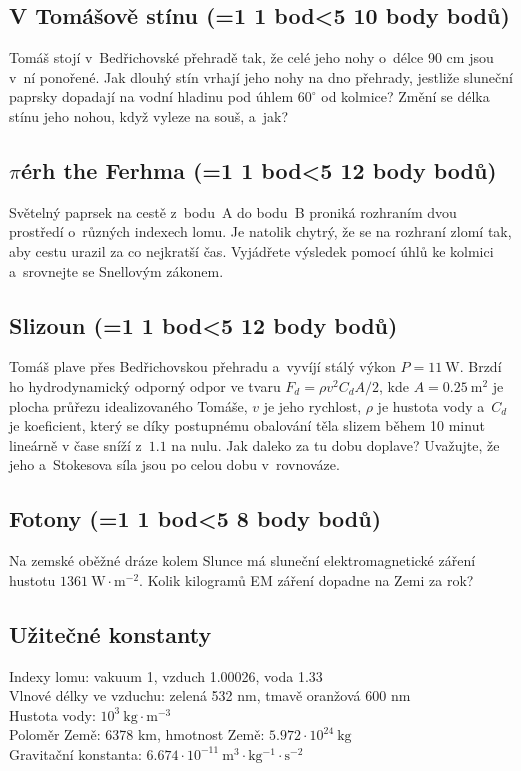 \documentclass[10pt,a4paper,landscape,twocolumn]{article}
\newcounter{bodycounter}
\newcommand{\bodystring}[1]{\ifnum #1=1 1 bod\else\ifnum #1<5 #1 body\else #1 bodů\fi\fi}
\newcommand{\uloha}[3]{
\subsection{#1 (\bodystring{#2})}
#3\addtocounter{bodycounter}{#2}}
\begin{document}
\uloha{V Tomášově stínu}{10}{
Tomáš stojí v~Bedřichovské přehradě tak, že celé jeho nohy o~délce 90 cm jsou v~ní ponořené. Jak dlouhý stín vrhají jeho nohy na dno přehrady, jestliže sluneční paprsky dopadají na vodní hladinu pod úhlem $60^\circ$ od kolmice? Změní se délka stínu jeho nohou, když vyleze na souš, a~jak?
}

\uloha{$\pi$érh the Ferhma}{12}{
Světelný paprsek na cestě z~bodu~A do bodu~B proniká rozhraním dvou prostředí o~různých indexech lomu. Je natolik chytrý, že se na rozhraní zlomí tak, aby cestu urazil za co nejkratší čas. Vyjádřete výsledek pomocí úhlů ke kolmici a~srovnejte se Snellovým zákonem.
}

\uloha{Slizoun}{12}{
Tomáš plave přes Bedřichovskou přehradu a~vyvíjí stálý výkon $P = 11~\mathrm{W}$. Brzdí ho hydrodynamický odporný odpor ve tvaru $F_d = \rho v^2 C_dA/2$, kde $A = 0.25~\mathrm{m^2}$ je plocha průřezu idealizovaného Tomáše, $v$ je jeho rychlost, $\rho$ je hustota vody a~$C_d$ je koeficient, který se díky postupnému obalování těla slizem během 10 minut lineárně v čase sníží z~$1.1$ na nulu. Jak daleko za tu dobu doplave? Uvažujte, že jeho \uv{plavecká síla} a~Stokesova síla jsou po celou dobu v~rovnováze.
}

\uloha{Fotony}{8}{
Na zemské oběžné dráze kolem Slunce má sluneční elektromagnetické záření hustotu $1361~\mathrm{W\cdot m^{-2}}$. Kolik kilogramů EM záření dopadne na Zemi za rok?
}

\subsection*{Užitečné konstanty}
Indexy lomu: vakuum 1, vzduch 1.00026, voda 1.33 \\
Vlnové délky ve vzduchu: zelená 532 nm, tmavě oranžová 600 nm\\
Hustota vody: $10^{3}~\mathrm{kg\cdot m^{-3}}$\\
Poloměr Země: 6378 km, hmotnost Země: $5.972\cdot 10^{24}~\mathrm{kg}$\\
Gravitační konstanta: $6.674\cdot 10^{-11}~\mathrm{m^3\cdot kg^{-1}\cdot s^{-2}}$

\end{document}
